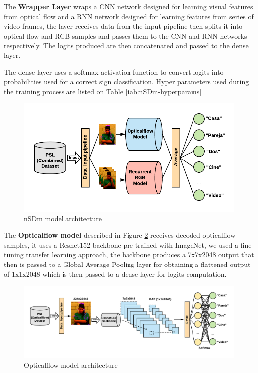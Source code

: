 \documentclass[twocolumn,conference]{article}
\begin{document}
The \textbf{Wrapper Layer} wraps a CNN network designed for learning visual features from optical flow and a RNN network designed for learning features from series of video frames, the layer receives data from the input pipeline then splits it into optical flow and RGB samples and passes them to the CNN and RNN networks respectively. The logits produced are then concatenated and passed to the dense layer.

The dense layer uses a softmax activation function to convert logits into probabilities used for a correct sign classification. Hyper parameters used during the training process are listed on Table \ref{tab:nSDm-hyperparams}

\begin{figure}[hbt!]
\includegraphics[width=\linewidth]{images/nsdm-model-architecture.png}
\caption{nSDm model architecture}
\label{fig:ndsm-architecture}
\end{figure}

The \textbf{Opticalflow model} described in Figure \ref{fig:opticalflow-architecture} receives decoded opticalflow samples, it uses a Resnet152 backbone pre-trained with ImageNet, we used a fine tuning transfer learning approach, the backbone produces a 7x7x2048 output that then is passed to a Global Average Pooling layer for obtaining a flattened output of 1x1x2048 which is then passed to a dense layer for logits computation.

\begin{figure}[hbt!]
\includegraphics[width=\linewidth]{images/opticalflow-model-architecture.png}
\caption{Opticalflow model architecture}
\label{fig:opticalflow-architecture}
\end{figure}
\end{document}
